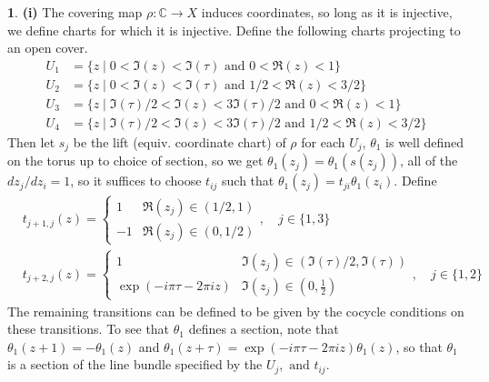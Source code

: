 \documentclass[10.5pt]{article}
\theoremstyle{definition}
\newtheorem{pb}{}
\newcommand{\set}[1]{\{#1\}}
\newcommand{\tand}{\text{ and }}
\begin{document}
    \begin{pb}
        \textbf{(i)} The covering map \(\rho: \mathbb{C} \to X\) induces coordinates, so long as it is injective, we define charts for which it is injective. Define the following charts projecting to an open cover.
        \begin{align*}
            U_1 &= \set{z \mid 0 < \Im(z) < \Im(\tau) \tand 0 < \Re(z) < 1} \\
            U_2 &= \set{z \mid 0 < \Im(z) < \Im(\tau) \tand 1/2 < \Re(z) < 3/2} \\
            U_3 &= \set{z \mid \Im(\tau)/2 < \Im(z) < 3\Im(\tau)/2 \tand 0 < \Re(z) < 1} \\
            U_4 &= \set{z \mid \Im(\tau)/2 < \Im(z) < 3\Im(\tau)/2 \tand 1/2 < \Re(z) < 3/2}
        \end{align*}
        Then let \(s_j\) be the lift (equiv. coordinate chart) of \(\rho\) for each \(U_j\), \(\theta_1\) is well defined on the torus up to choice of section, so we get \(\theta_1(z_j) = \theta_1(s(z_j))\), all of the \(dz_j/dz_i = 1\), so it suffices to choose \(t_{ij}\) such that \(\theta_1(z_j) = t_{ji}\theta_1(z_i)\). Define
        \begin{align*}
            &t_{j+1,j}(z) = \begin{cases}
                1 & \Re(z_j) \in (1/2,1) \\
                -1 & \Re(z_j) \in (0,1/2)
            \end{cases}, \quad j \in \set{1,3} \\
            &t_{j+2,j}(z) = \begin{cases}
                1 & \Im(z_j) \in (\Im(\tau)/2,\Im(\tau)) \\
                \exp(-i\pi \tau - 2\pi i z) & \Im(z_j) \in (0,\frac12)
            \end{cases}, \quad j \in \set{1,2}
        \end{align*}
        The remaining transitions can be defined to be given by the cocycle conditions on these transitions. To see that \(\theta_1\) defines a section, note that \(\theta_1(z + 1) = -\theta_1(z)\) and \(\theta_1(z + \tau) = \exp(-i\pi \tau - 2\pi i z)\theta_1(z)\), so that \(\theta_1\) is a section of the line bundle specified by the \(U_j, \tand t_{ij}\).


\end{pb}
\end{document}
